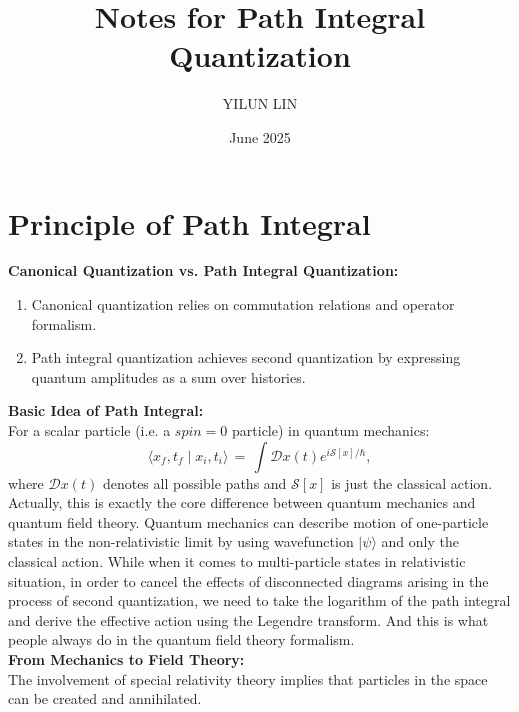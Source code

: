 \documentclass[11pt]{article}
\title{Notes for Path Integral Quantization}
\author{YILUN LIN}
\date{June 2025}
\numberwithin{equation}{section}
\begin{document}
\maketitle

\section{Principle of Path Integral}
\textbf{Canonical Quantization vs. Path Integral Quantization:}
\begin{enumerate}
    \item Canonical quantization relies on commutation relations and operator
    formalism.
    \item Path integral quantization achieves second quantization by expressing quantum amplitudes as a sum over histories.
\end{enumerate}
\textbf{Basic Idea of Path Integral:}\\
For a scalar particle (i.e. a $spin=0$ particle) in quantum mechanics:
\begin{equation}
    \langle x_f,t_f\mid x_i,t_i\rangle\,=\,\int\!\mathcal{D}x(t)e^{i\mathcal S[x]/\hbar},
\end{equation}
where $\mathcal Dx(t)$ denotes all possible paths and $\mathcal S[x]$ is just the classical action. Actually, this is exactly the core difference between quantum mechanics and quantum field theory. Quantum mechanics can describe motion of one-particle states in the non-relativistic limit by using wavefunction $\lvert\psi\rangle$ and only the classical action. While when it comes to multi-particle states in relativistic situation, in order to cancel the effects of disconnected diagrams arising in the process of second quantization, we need to take the logarithm of the path integral and derive the effective action using the Legendre transform. And this is what people always do in the quantum field theory formalism.\\[0.5em]
\textbf{From Mechanics to Field Theory:}\\
The involvement of special relativity theory implies that particles in the space can be created and annihilated.
\end{document}
